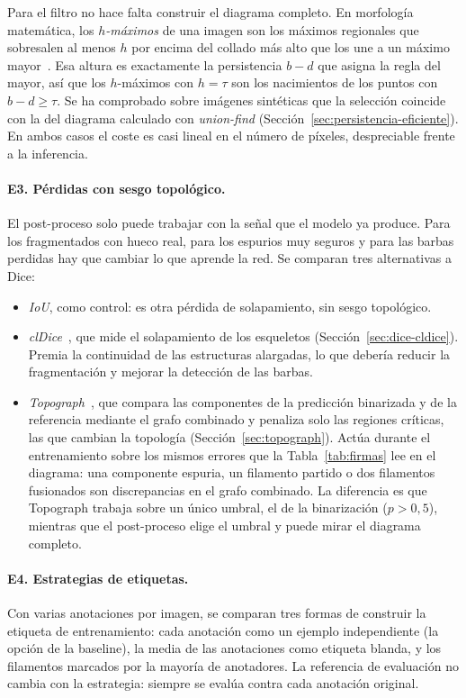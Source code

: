 Para el filtro no hace falta construir el diagrama completo. En
morfología matemática, los \emph{$h$-máximos} de una
imagen son los máximos regionales que sobresalen al menos $h$ por
encima del collado más alto que los une a un máximo
mayor~\cite{soille2003}. Esa altura es exactamente la persistencia
$b-d$ que asigna la regla del mayor, así que los $h$-máximos con
$h=\tau$ son los nacimientos de los puntos con $b-d\ge\tau$. Se ha
comprobado sobre imágenes sintéticas que la selección coincide con la
del diagrama calculado con \emph{union-find}
(Sección~\ref{sec:persistencia-eficiente}). En ambos casos el coste es
casi lineal en el número de píxeles, despreciable frente a la
inferencia.

\paragraph{E3. Pérdidas con sesgo topológico.} El post-proceso solo
puede trabajar con la señal que el modelo ya produce. Para los
fragmentados con hueco real, para los espurios muy seguros y para las
barbas perdidas hay que cambiar lo que aprende la red. Se comparan tres
alternativas a Dice:
\begin{itemize}
  \item \emph{IoU}, como control: es otra pérdida de solapamiento, sin
  sesgo topológico.
  \item \emph{clDice}~\cite{shit2021}, que mide el solapamiento de los
  esqueletos (Sección~\ref{sec:dice-cldice}). Premia la continuidad de
  las estructuras alargadas, lo que debería reducir la fragmentación y
  mejorar la detección de las barbas.
  \item \emph{Topograph}~\cite{lux2025}, que compara las componentes de
  la predicción binarizada y de la referencia mediante el grafo
  combinado y penaliza solo las regiones críticas, las que cambian la
  topología (Sección~\ref{sec:topograph}). Actúa durante el
  entrenamiento sobre los mismos errores que la Tabla~\ref{tab:firmas}
  lee en el diagrama: una componente espuria, un filamento partido o dos
  filamentos fusionados son discrepancias en el grafo combinado. La
  diferencia es que Topograph trabaja sobre un único umbral, el de la
  binarización ($p>0{,}5$), mientras que el post-proceso elige el
  umbral y puede mirar el diagrama completo.
\end{itemize}

\paragraph{E4. Estrategias de etiquetas.} Con varias anotaciones por
imagen, se comparan tres formas de construir la etiqueta de
entrenamiento: cada anotación como un ejemplo independiente (la opción
de la baseline), la media de las anotaciones como etiqueta blanda, y los
filamentos marcados por la mayoría de anotadores. La referencia de
evaluación no cambia con la estrategia: siempre se evalúa contra cada
anotación original.

